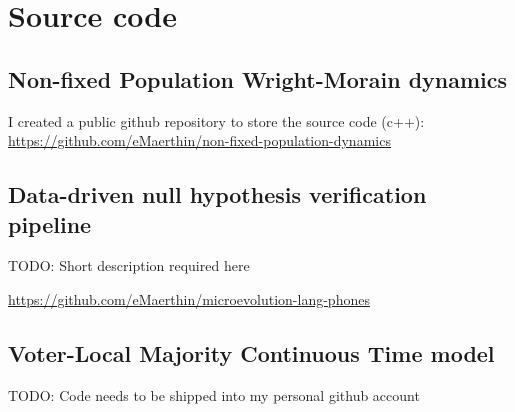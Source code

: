 \section{Source code}
\subsection{Non-fixed Population Wright-Morain dynamics}
I created a public github repository to store the source code (c++): 
\url{https://github.com/eMaerthin/non-fixed-population-dynamics}

\subsection{Data-driven null hypothesis verification pipeline}
TODO: Short description required here

\url{https://github.com/eMaerthin/microevolution-lang-phones}

\subsection{Voter-Local Majority Continuous Time model}
TODO: Code needs to be shipped into my personal github account
